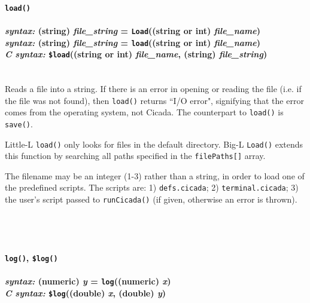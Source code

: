 \documentclass{article}
\begin{document}






\paragraph{\texttt{load()}\\\\
\normalfont \emph{syntax: } (string) \emph{file\_string} = \texttt{Load}((string or int) \emph{file\_name})\\
\normalfont \emph{syntax: } (string) \emph{file\_string} = \texttt{load}((string or int) \emph{file\_name})\\
\normalfont \emph{C syntax: } \texttt{\$load}((string or int) \emph{file\_name}, (string) \emph{file\_string})\\\\}
 

Reads a file into a string.  If there is an error in opening or reading the file (i.e. if the file was not found), then \texttt{load()} returns ``I/O error", signifying that the error comes from the operating system, not Cicada.  The counterpart to \texttt{load()} is \texttt{save()}.

Little-L \texttt{load()} only looks for files in the default directory.  Big-L \texttt{Load()} extends this function by searching all paths specified in the \texttt{filePaths[]} array.

The filename may be an integer (1-3) rather than a string, in order to load one of the predefined scripts.  The scripts are:  1) \verb#defs.cicada#; 2) \verb#terminal.cicada#; 3) the user's script passed to \verb#runCicada()# (if given, otherwise an error is thrown).\\\\\\\\

 





\paragraph{\texttt{log()}, \texttt{\$log()}\\\\
\normalfont \emph{syntax: } (numeric) \emph{y} = \texttt{log}((numeric) \emph{x})\\
\normalfont \emph{C syntax: } \texttt{\$log}((double) \emph{x}, (double) \emph{y})\\\\}
\end{document}
